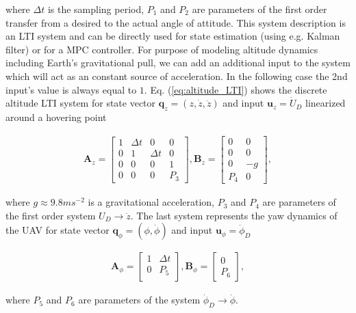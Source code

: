 where $\Delta t$ is the sampling period, $P_1$ and $P_2$ are parameters of the first order transfer from a desired to the actual angle of attitude. This system description is an LTI system and can be directly used for state estimation (using e.g. Kalman filter) or for a MPC controller. For purpose of modeling altitude dynamics including Earth's gravitational pull, we can add an additional input to the system which will act as an constant source of acceleration. In the following case the 2nd input's value is always equal to $1$. Eq. (\ref{eq:altitude_LTI}) shows the discrete altitude LTI system for state vector $\mathbf{q}_{z} = \left(z, \dot{z}, \ddot{z}\right)$ and input $\mathbf{u}_z = \dot{U}_D$ linearized around a hovering point

\begin{equation}
\begin{split}
\mathbf{A}_{z} = \begin{bmatrix}
1 & \Delta t & 0 & 0\\
0 & 1 & \Delta t & 0\\
0 & 0 & 0 & 1 \\
0 & 0 & 0 & P_3
\end{bmatrix}, \mathbf{B}_{z} = \begin{bmatrix}
0 & 0\\
0 & 0\\
0 & -g\\
P_4 & 0
\end{bmatrix},
\end{split}
\label{eq:altitude_LTI}
\end{equation}

where $g \approx 9.8 ms^{-2}$ is a gravitational acceleration, $P_3$ and $P_4$ are parameters of the first order system $U_D \rightarrow \ddot{z}$. The last system represents the yaw dynamics of the UAV for state vector $\mathbf{q}_{\phi} = \left(\phi, \dot{\phi}\right)$ and input $\mathbf{u}_\phi = \dot{\phi}_D$

\begin{equation}
\begin{split}
\mathbf{A}_{\phi} = \begin{bmatrix}
1 & \Delta t\\
0 & P_5 \\
\end{bmatrix}, \mathbf{B}_{\phi} = \begin{bmatrix}
0\\
P_6
\end{bmatrix},
\end{split}
\end{equation}

where $P_5$ and $P_6$ are parameters of the system $\dot{\phi}_D \rightarrow \dot{\phi}$.